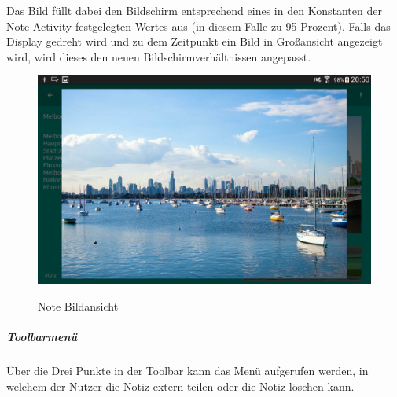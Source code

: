 Das Bild füllt dabei den Bildschirm entsprechend eines in den Konstanten der Note-Activity festgelegten Wertes aus (in diesem Falle zu 95 Prozent). Falls das Display gedreht wird und zu dem Zeitpunkt ein Bild in Großansicht angezeigt wird, wird dieses den neuen Bildschirmverhältnissen angepasst.

\begin{figure}[H]
\centering
\begin{minipage}[t]{1\textwidth} %
\caption{Note Bildansicht} %
\includegraphics[width=1 \textwidth]{img/note_imageOverlay_landscape}\\ %
\end{minipage}
\end{figure}

\subparagraph{Toolbarmenü}
Über die Drei Punkte in der Toolbar kann das Menü aufgerufen werden, in welchem der Nutzer die Notiz extern teilen oder die Notiz löschen kann.

